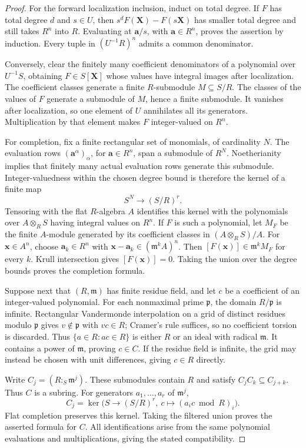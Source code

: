 \begin{proof}
For the forward localization inclusion, induct on total degree.
If $F$ has total degree $d$ and $s\in U$, then
$s^dF(\mathbf X)-F(s\mathbf X)$ has smaller total degree and still
takes $R^n$ into $R$.  Evaluating at $\mathbf a/s$, with
$\mathbf a\in R^n$, proves the assertion by induction.  Every tuple
in $(U^{-1}R)^n$ admits a common denominator.

Conversely, clear the finitely many coefficient denominators of a
polynomial over $U^{-1}S$, obtaining $F\in S[\mathbf X]$ whose values
have integral images after localization.  The coefficient classes
generate a finite $R$-submodule $M\subseteq S/R$.  The classes of
the values of $F$ generate a submodule of $M$, hence a finite
submodule.  It vanishes after localization, so one element of $U$
annihilates all its generators.  Multiplication by that element
makes $F$ integer-valued on $R^n$.

For completion, fix a finite rectangular set of monomials, of
cardinality $N$.  The evaluation rows
$(\mathbf a^\alpha)_\alpha$, for $\mathbf a\in R^n$, span a
submodule of $R^N$.  Noetherianity implies that finitely many actual
evaluation rows generate this submodule.  Integer-valuedness within
the chosen degree bound is therefore the kernel of a finite map
\[
 S^N\longrightarrow(S/R)^r.
\]
Tensoring with the flat $R$-algebra $A$ identifies this kernel with
the polynomials over $A\otimes_R S$ having integral values on $R^n$.
If $F$ is such a polynomial, let $M_F$ be the finite $A$-module
generated by its coefficient classes in $(A\otimes_R S)/A$.
For $\mathbf x\in A^n$, choose
$\mathbf a_k\in R^n$ with
$\mathbf x-\mathbf a_k\in(\mathfrak m^kA)^n$.  Then
$[F(\mathbf x)]\in\mathfrak m^kM_F$ for every $k$.
Krull intersection gives $[F(\mathbf x)]=0$.  Taking the union
over the degree bounds proves the completion formula.

Suppose next that $(R,\mathfrak m)$ has finite residue field, and
let $c$ be a coefficient of an integer-valued polynomial.
For each nonmaximal prime $\mathfrak p$, the domain
$R/\mathfrak p$ is infinite.  Rectangular Vandermonde interpolation
on a grid of distinct residues modulo $\mathfrak p$ gives
$v\notin\mathfrak p$ with $vc\in R$; Cramer's rule suffices,
so no coefficient torsion is discarded.  Thus
$\{a\in R:ac\in R\}$ is either $R$ or an ideal with radical
$\mathfrak m$.  It contains a power of $\mathfrak m$, proving
$c\in C$.  If the residue field is infinite, the grid may instead
be chosen with unit differences, giving $c\in R$ directly.

Write $C_j=(R:_S\mathfrak m^j)$.  These submodules contain $R$
and satisfy $C_jC_k\subseteq C_{j+k}$.  Thus $C$ is a subring.
For generators $a_1,\ldots,a_r$ of $\mathfrak m^j$,
\[
 C_j=\ker\bigl(S\longrightarrow(S/R)^r,\ 
                    c\longmapsto(a_ic\bmod R)_i\bigr).
\]
Flat completion preserves this kernel.  Taking the filtered union
proves the asserted formula for $C$.  All identifications arise
from the same polynomial evaluations and multiplications, giving
the stated compatibility.
\end{proof}
